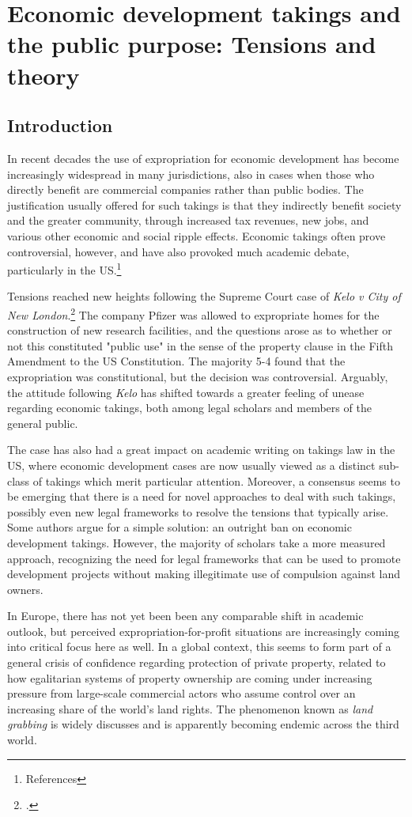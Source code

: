 \chapter{Economic development takings and the public purpose: Tensions and theory}

\section{Introduction}

In recent decades the use of expropriation for economic development has become increasingly widespread in many jurisdictions, also in cases when those who directly benefit are commercial companies rather than public bodies. The justification usually offered for such takings is that they indirectly benefit society and the greater community, through increased tax revenues, new jobs, and various other economic and social ripple effects. Economic takings often prove controversial, however, and have also provoked much academic debate, particularly in the US.\footnote{References}

Tensions reached new heights following the Supreme Court case of {\it Kelo v City of New London}.\footcite{kelo05}  The company Pfizer was allowed to expropriate homes for the construction of new research facilities, and the questions arose as to whether or not this constituted "public use" in the sense of the property clause in the Fifth Amendment to the US Constitution.  The majority 5-4 found that the expropriation was constitutional, but the decision was controversial. Arguably, the attitude following {\it Kelo} has shifted towards a greater feeling of unease regarding economic takings, both among legal scholars and members of the general public.

The case has also had a great impact on academic writing on takings law in the US, where economic development cases are now usually viewed as a distinct sub-class of takings which merit particular attention. Moreover, a consensus seems to be emerging that there is a need for novel approaches to deal with such takings, possibly even new legal frameworks to resolve the tensions that typically arise. Some authors argue for a simple solution: an outright ban on economic development takings. However, the majority of scholars take a more measured approach, recognizing the need for legal frameworks that can be used to promote development projects without making illegitimate use of compulsion against land owners.

In Europe, there has not yet been been any comparable shift in academic outlook, but perceived expropriation-for-profit situations are increasingly coming into critical focus here as well. In a global context, this seems to form part of a general crisis of confidence regarding protection of private property, related to how  egalitarian systems of property ownership are coming under increasing pressure from large-scale commercial actors who assume control over an increasing share of the world's land rights. The phenomenon known as {\it land grabbing} is widely discusses and is apparently becoming endemic across the third world.

